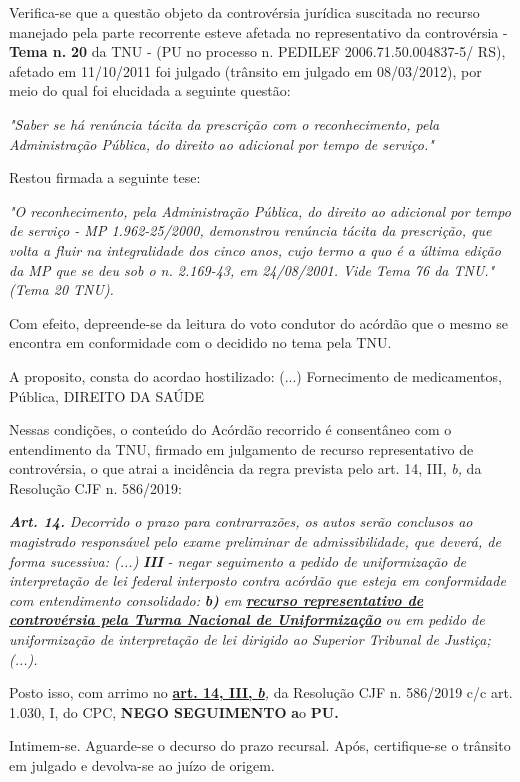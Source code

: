 \documentclass[12pt]{article}
\begin{document}
\justifying
\noindent Verifica-se que a questão objeto da controvérsia jurídica suscitada no recurso manejado pela parte recorrente esteve afetada no representativo da controvérsia - \textbf{Tema n. }\textbf{20} da TNU - (PU no processo n. PEDILEF 2006.71.50.004837-5/ RS),  afetado em 11/10/2011 foi julgado (trânsito em julgado em 08/03/2012), por meio do qual foi elucidada a seguinte questão:

\noindent \textit{"Saber se há renúncia tácita da prescrição com o reconhecimento, pela Administração Pública, do direito ao adicional por tempo de serviço."}

\noindent Restou firmada a seguinte tese:

\noindent \textit{"O reconhecimento, pela Administração Pública, do direito ao adicional por tempo de serviço - MP 1.962-25/2000, demonstrou renúncia tácita da prescrição, que volta a fluir na integralidade dos cinco anos, cujo termo a quo é a última edição da MP que se deu sob o n. 2.169-43, em 24/08/2001. Vide Tema 76 da TNU." (Tema 20 TNU).}

\noindent Com efeito, depreende-se da leitura do voto condutor do acórdão que o mesmo se encontra em conformidade com o decidido no  tema pela TNU.

\noindent A proposito, consta do acordao hostilizado: (...) Fornecimento de medicamentos, Pública, DIREITO DA SAÚDE

\noindent Nessas condições, o conteúdo do Acórdão recorrido é consentâneo com o entendimento da TNU, firmado em julgamento de recurso representativo de controvérsia, o que atrai a incidência da regra prevista pelo art. 14, III, \textit{b,} da Resolução CJF n. 586/2019:

\noindent \textit{\textbf{Art. 14.}}\textit{ Decorrido o prazo para contrarrazões, os autos serão conclusos ao magistrado responsável pelo exame preliminar de admissibilidade, que deverá, de forma sucessiva: (...) }\textit{\textbf{III }}\textit{- negar seguimento a pedido de uniformização de interpretação de lei federal interposto contra acórdão que esteja em conformidade com entendimento consolidado: }\textit{\textbf{b)}}\textit{ em }\uline{\textit{\textbf{recurso representativo de controvérsia pela Turma Nacional de Uniformização}}}\textit{ ou em pedido de uniformização de interpretação de lei dirigido ao Superior Tribunal de Justiça;(...).}

\noindent Posto isso, com arrimo no \uline{\textbf{art. 14, III, }}\uline{\textit{\textbf{b}}}\textit{,} da Resolução CJF n. 586/2019 c/c art. 1.030, I, do CPC, \textbf{NEGO SEGUIMENTO }\textbf{a}o\textbf{ PU}\textbf{.}

\noindent Intimem-se. Aguarde-se o decurso do prazo recursal. Após, certifique-se o trânsito em julgado e devolva-se ao juízo de origem.
\end{document}

